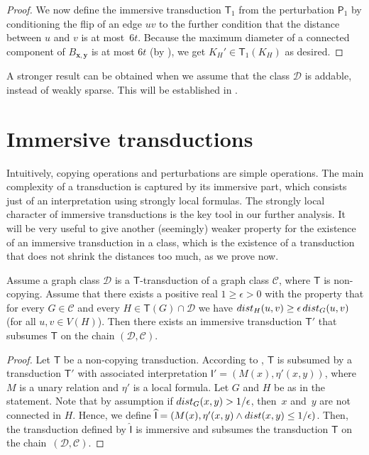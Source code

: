 \documentclass{lmcs}
\newcommand{\Cc}{\mathscr{C}}
\newcommand{\Dd}{\mathscr{D}}
\theoremstyle{definition}
\begin{document}
\begin{proof}
	We now define the immersive transduction $\mathsf T_1$ from the perturbation $\mathsf P_1$ by conditioning the flip of an edge $uv$ to the further condition that the distance between $u$ and $v$ is at most~$6t$. Because the maximum diameter of a connected component of $B_{\mathbf x,\mathbf y}$ is at most $6t$ (by ), we get $K_H'\in\mathsf T_1(K_H)$ as desired.
\end{proof}

A stronger result can be obtained when we assume that the class $\Dd$ is addable, instead of weakly sparse. This will be established in .

\section{Immersive transductions}
\label{sec:immersive}

Intuitively, copying operations and perturbations are simple operations. 
The main complexity of a transduction is captured by its immersive part, which consists just of an interpretation using strongly local formulas. 
The strongly local character of immersive transductions is the key tool in 
our further analysis. It will be very useful to give another (seemingly) 
weaker property for the existence of an immersive transduction in a
class, 
which is the existence of a transduction that does not shrink the distances too much, as we prove now.


\begin{lem}
	\label{lem:epsilon}
	Assume a graph class $\Dd$ is a $\mathsf T$-transduction  of a graph class $\Cc$, where $\mathsf T$ is non-copying.
	Assume that there exists a positive real $1\geq \epsilon>0$ with the property that 
	for every $G\in\Cc$ and every $H\in \mathsf T(G)\cap\Dd$ we have
	${\rm dist}_{H}(u,v)\geq \epsilon\,{\rm dist}_G(u,v)$ (for all $u,v\in V(H)$).
	Then there exists an immersive transduction $\mathsf T'$
	that subsumes $\mathsf T$ on the chain $(\Dd,\Cc)$.
\end{lem}
\begin{proof}
	Let $\mathsf T$ be a non-copying transduction.
	According to , $\mathsf T$ is subsumed by a transduction $\mathsf T'$ with associated interpretation $\mathsf I'=(M(x),\eta'(x,y))$, where $M$ is a unary relation and $\eta'$ is a local formula. Let $G$ and $H$ be as in the statement. Note that by assumption if $\rm{dist}_G(x,y)>1/\epsilon$, then~$x$ and~$y$ are not connected in $H$. Hence, we define
	$\widehat{\mathsf I}=(M(x),\eta'(x,y)\wedge {\rm dist}(x,y)\leq 1/\epsilon)$. Then, the transduction defined by $\widehat{\mathsf I}$ is immersive and subsumes the transduction $\mathsf T$ on the chain~$(\Dd,\Cc)$.
\end{proof}
\end{document}
